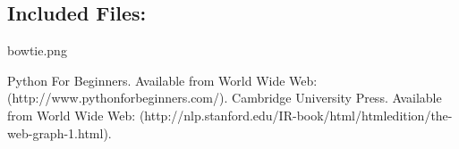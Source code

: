 \documentclass[a4paper, 11pt]{article}
\begin{document}
\subsection*{Included Files:}
bowtie.png

\begin{thebibliography}{9}
 Python For Beginners. Available from World Wide Web:(http://www.pythonforbeginners.com/).
 Cambridge University Press. Available from World Wide Web: (http://nlp.stanford.edu/IR-book/html/htmledition/the-web-graph-1.html).
\end{thebibliography}
\end{document}
